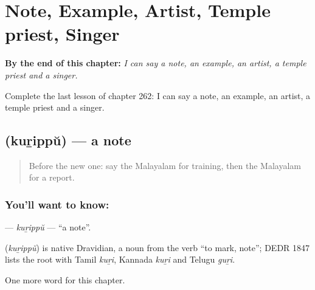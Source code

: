 
\chapter{Note, Example, Artist, Temple priest, Singer}
\label{ch:ml-note-example-artist-temple-priest-singer}

\begin{chapteropening}
\textbf{By the end of this chapter:} \emph{I can say a note, an example, an artist, a temple priest and a singer.}

Complete the last lesson of chapter 262: I can say a note, an example, an artist, a temple priest and a singer.
\end{chapteropening}

\section[\texorpdfstring{\ml{കുറിപ്പ്} (kuṟippŭ)}{കുറിപ്പ് (kuṟippŭ)}]{ (kuṟippŭ) — a note}

\label{lesson:ML-C262-kurippu}



\begin{quote}
Before the new one: say the Malayalam for training, then the Malayalam for a report.
\end{quote}

\subsection*{You'll want to know: }
\textbf{} — \emph{kuṟippŭ} — \textquotedblleft{}a note\textquotedblright{}.

\begin{cousinweb}
\textbf{} (\emph{kuṟippŭ}) is native Dravidian, a noun from the verb \textquotedblleft{}to mark, note\textquotedblright{}; DEDR 1847 lists the root with Tamil \emph{kuṟi}, Kannada \emph{kuṟi} and Telugu \emph{guṟi}.
\end{cousinweb}

\begin{grammarlens}[title={What you've built}]
One more word for this chapter.
\end{grammarlens}

